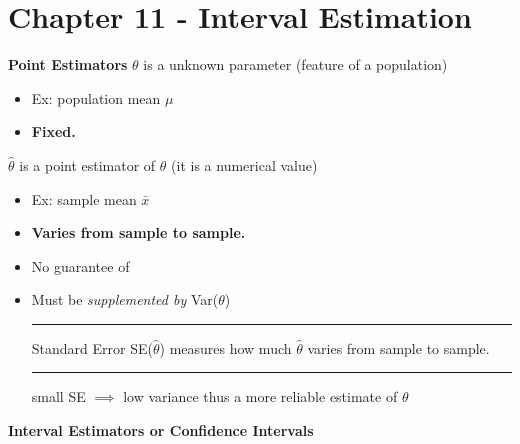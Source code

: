 \documentclass[]{article}
\begin{document}
\maketitle

\newpage
\Huge\section{Chapter 11 - Interval Estimation}
\Large\textbf{Point Estimators}
\newline $\theta$ is a unknown parameter (feature of a population)
\begin{itemize}
	\item Ex: population mean $\mu$
	\item \textbf{Fixed.} \newline
\end{itemize}
$\hat\theta$ is a point estimator of $\theta$ (it is a numerical value) 
\begin{itemize}
	\item Ex: sample mean $\bar{x}$
	\item \textbf{Varies from sample to sample.}
	\item No guarantee of 
	\item Must be \textit{supplemented by} Var($\theta$)
	\newline\Large\rule{1.3cm}{0pt} Standard Error SE($\hat\theta$) measures how much $\hat\theta$ varies from sample to sample.
	\newline\Large\rule{1.3cm}{0pt} small SE $\implies$ low variance thus a more reliable estimate of $\theta$ \newline
\end{itemize}
\Large\textbf{Interval Estimators or Confidence Intervals}


 
\section{}
\end{document}
